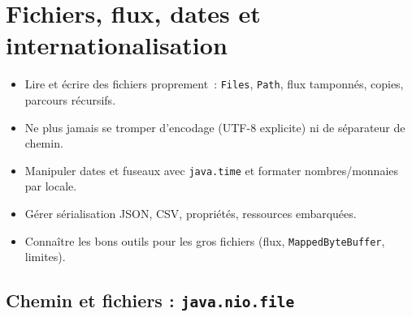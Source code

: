 \documentclass[12pt,a4paper,twoside,openright]{book}
\begin{document}
\chapter{Fichiers, flux, dates et internationalisation}
\label{ch-java-io}

\begin{objectif}
\begin{itemize}
  \item Lire et \'ecrire des fichiers proprement~: \verb|Files|, \verb|Path|, flux tamponn\'es,
        copies, parcours r\'ecursifs.
  \item Ne plus jamais se tromper d'encodage (UTF-8 explicite) ni de s\'eparateur de chemin.
  \item Manipuler dates et fuseaux avec \verb|java.time| et formater nombres/monnaies par locale.
  \item G\'erer s\'erialisation JSON, CSV, propri\'et\'es, ressources embarqu\'ees.
  \item Conna\^itre les bons outils pour les gros fichiers (flux, \verb|MappedByteBuffer|, limites).
\end{itemize}
\end{objectif}

\section{Chemin et fichiers : \texttt{java.nio.file}}
\end{document}
